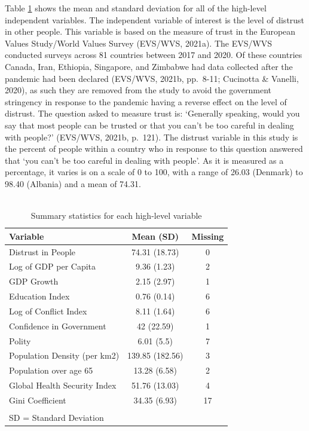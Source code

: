 \documentclass[
  12pt,
]{article}
\begin{document}
\hfill\break
Table \ref{tab:stats} shows the mean and standard deviation for all of the high-level independent variables. The independent variable of interest is the level of distrust in other people. This variable is based on the measure of trust in the European Values Study/World Values Survey (EVS/WVS, 2021a). The EVS/WVS conducted surveys across 81 countries between 2017 and 2020. Of these countries Canada, Iran, Ethiopia, Singapore, and Zimbabwe had data collected after the pandemic had been declared (EVS/WVS, 2021b, pp.~8-11; Cucinotta \& Vanelli, 2020), as such they are removed from the study to avoid the government stringency in response to the pandemic having a reverse effect on the level of distrust. The question asked to measure trust is: `Generally speaking, would you say that most people can be trusted or that you can't be too careful in dealing with people?' (EVS/WVS, 2021b, p.~121). The distrust variable in this study is the percent of people within a country who in response to this question answered that `you can't be too careful in dealing with people'. As it is measured as a percentage, it varies is on a scale of 0 to 100, with a range of 26.03 (Denmark) to 98.40 (Albania) and a mean of 74.31.\\
~\\

\begin{table}

\caption{\label{tab:stats}Summary statistics for each high-level variable}
\centering
\begin{tabular}[t]{lcc}
\toprule
Variable & Mean (SD) & Missing\\
\midrule
Distrust in People & 74.31 (18.73) & 0\\
Log of GDP per Capita & 9.36 (1.23) & 2\\
GDP Growth & 2.15 (2.97) & 1\\
Education Index & 0.76 (0.14) & 6\\
Log of Conflict Index & 8.11 (1.64) & 6\\
\addlinespace
Confidence in Government & 42 (22.59) & 1\\
Polity & 6.01 (5.5) & 7\\
Population Density (per km2) & 139.85 (182.56) & 3\\
Population over age 65 & 13.28 (6.58) & 2\\
Global Health Security Index & 51.76 (13.03) & 4\\
\addlinespace
Gini Coefficient & 34.35 (6.93) & 17\\
\bottomrule
\multicolumn{3}{l}{\textsuperscript{} \small{SD = Standard Deviation}}\\
\end{tabular}
\end{table}
\end{document}

